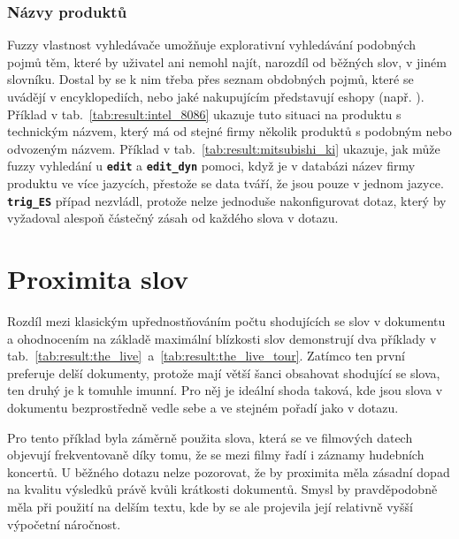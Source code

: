 \documentclass[11pt,letterpaper,oneside,openright]{book}
\newcommand{\bftt}[1]{\texttt{\textbf{#1}}}
\begin{document}
\subsubsection{Názvy produktů}

\mbox{}\mbox{}

Fuzzy vlastnost vyhledávače umožňuje explorativní vyhledávání podobných pojmů
těm, které by uživatel ani nemohl najít, narozdíl od běžných slov, v jiném
slovníku. Dostal by se k nim třeba přes seznam obdobných pojmů, které se
uvádějí v encyklopediích, nebo jaké nakupujícím představují eshopy (např.
). Příklad v tab.~\ref{tab:result:intel_8086}
ukazuje tuto situaci na produktu s technickým názvem, který má od stejné firmy
několik produktů s podobným nebo odvozeným názvem. Příklad v
tab.~\ref{tab:result:mitsubishi_ki} ukazuje, jak může fuzzy vyhledání u
\bftt{edit} a \bftt{edit\_dyn} pomoci, když je v databázi název firmy produktu
ve více jazycích, přestože se data tváří, že jsou pouze v jednom jazyce.
\bftt{trig\_ES} případ nezvládl, protože nelze jednoduše nakonfigurovat dotaz,
který by vyžadoval alespoň částečný zásah od každého slova v dotazu.

\mbox{}\mbox{}




\section{Proximita slov}
Rozdíl mezi klasickým upřednostňováním počtu shodujících se slov v
dokumentu a ohodnocením na základě maximální blízkosti slov demonstrují
dva příklady v
tab.~\ref{tab:result:the_live}~a~\ref{tab:result:the_live_tour}. Zatímco
ten první preferuje delší dokumenty, protože mají větší šanci obsahovat
shodující se slova, ten druhý je k tomuhle imunní. Pro něj je ideální
shoda taková, kde jsou slova v dokumentu bezprostředně vedle sebe a ve
stejném pořadí jako v dotazu.

Pro tento příklad byla záměrně použita slova, která se ve filmových datech
objevují frekventovaně díky tomu, že se mezi filmy řadí i záznamy hudebních
koncertů. U běžného dotazu nelze pozorovat, že by proximita měla zásadní dopad
na kvalitu výsledků právě kvůli krátkosti dokumentů. Smysl by pravděpodobně
měla při použití na delším textu, kde by se ale projevila její relativně vyšší
výpočetní náročnost.


\mbox{}\mbox{}
\end{document}
